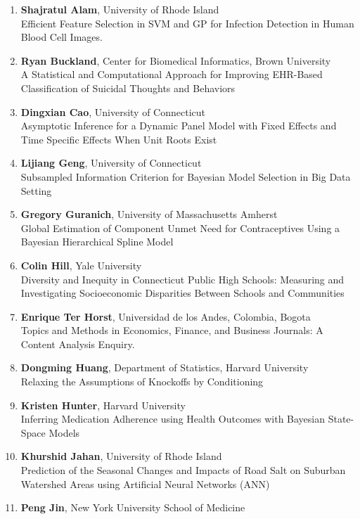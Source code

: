 
\begin{enumerate}
\item \textbf{Shajratul Alam}, University of Rhode Island \\
Efficient Feature Selection in SVM and GP for Infection Detection in Human Blood Cell Images.
\item \textbf{Ryan Buckland}, Center for Biomedical Informatics, Brown University \\
A Statistical and Computational Approach for Improving EHR-Based Classification of Suicidal Thoughts and Behaviors
\item \textbf{Dingxian Cao}, University of Connecticut \\
Asymptotic Inference for a Dynamic Panel Model with Fixed Effects and Time Specific Effects When Unit Roots Exist
\item \textbf{Lijiang Geng}, University of Connecticut \\
Subsampled Information Criterion for Bayesian Model Selection in Big Data Setting
\item \textbf{Gregory Guranich}, University of Massachusetts Amherst \\
Global Estimation of Component Unmet Need for Contraceptives Using a Bayesian Hierarchical Spline Model
\item \textbf{Colin Hill}, Yale University \\
Diversity and Inequity in Connecticut Public High Schools: Measuring and Investigating Socioeconomic Disparities Between Schools and Communities
\item \textbf{Enrique Ter Horst}, Universidad de los Andes, Colombia, Bogota \\
Topics and Methods in Economics, Finance, and Business Journals: A Content Analysis Enquiry.
\item \textbf{Dongming Huang}, Department of Statistics, Harvard University \\
Relaxing the Assumptions of Knockoffs by Conditioning
\item \textbf{Kristen Hunter}, Harvard University \\
Inferring Medication Adherence using Health Outcomes with Bayesian State-Space Models
\item \textbf{Khurshid Jahan}, University of Rhode Island \\
Prediction of the Seasonal Changes and Impacts of Road Salt on Suburban Watershed Areas using Artificial Neural Networks (ANN)
\item \textbf{Peng Jin}, New York University School of Medicine \\

\end{enumerate}
